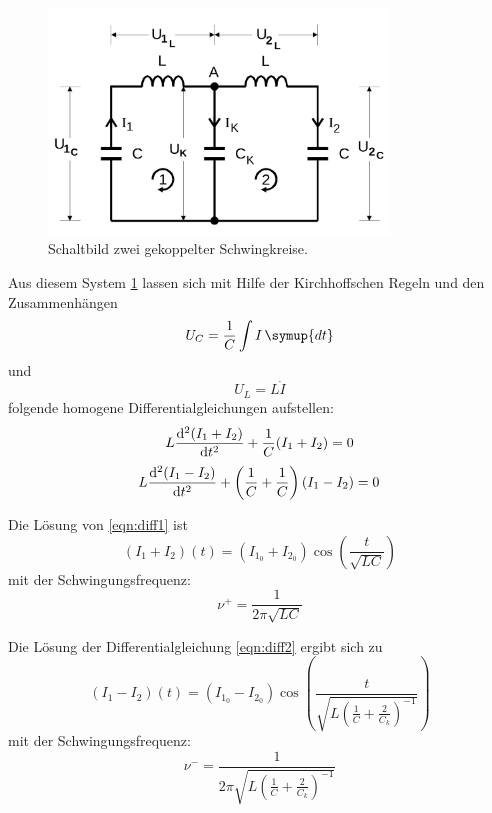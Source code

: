 \begin{figure}

    \centering
    \includegraphics[height=6.0cm]{data/Bild2.png}
    \caption{Schaltbild zwei gekoppelter Schwingkreise.}
    \label{fig:bild2}
\end{figure}

Aus diesem System \ref{fig:bild2} lassen sich mit Hilfe der Kirchhoffschen Regeln und den Zusammenhängen
\begin{equation*}
    U_C=\frac{1}{C}\int I \, \symup{dt}
\end{equation*}
und
\begin{equation*}
    U_L=L\dot{I}
\end{equation*}
folgende homogene Differentialgleichungen aufstellen:
\begin{equation}
\label{eqn:diff1}
    L\dv[2]{(I_1+I_2)}{t}+\frac{1}{C}(I_1+I_2)=0 
\end{equation}
\begin{equation}
\label{eqn:diff2}
    L\dv[2]{(I_1-I_2)}{t}+\left(\frac{1}{C}+\frac{1}{C}\right)(I_1-I_2)=0 
\end{equation}

Die Lösung von \eqref{eqn:diff1} ist 
\begin{equation}
\label{eqn:l1}
    (I_1+I_2)(t)=(I_{1_0}+I_{2_0})\cos(\frac{t}{\sqrt{LC}})
\end{equation}
mit der Schwingungsfrequenz:
\begin{equation}
\label{eqn:frq1}
    \nu^+=\frac{1}{2\pi\sqrt{LC}}
\end{equation}

Die Lösung der Differentialgleichung \eqref{eqn:diff2} ergibt sich zu
\begin{equation}
\label{eqn:l2}
    (I_1-I_2)(t)=(I_{1_0}-I_{2_0})\cos(\frac{t}{\sqrt{L\left(\frac{1}{C}+\frac{2}{C_k}\right)^{-1}}})
\end{equation}
mit der Schwingungsfrequenz:
\begin{equation}
\label{eqn:frq2}
    \nu^-=\frac{1}{2\pi\sqrt{L\left(\frac{1}{C}+\frac{2}{C_k}\right)^{-1}}}
\end{equation}


